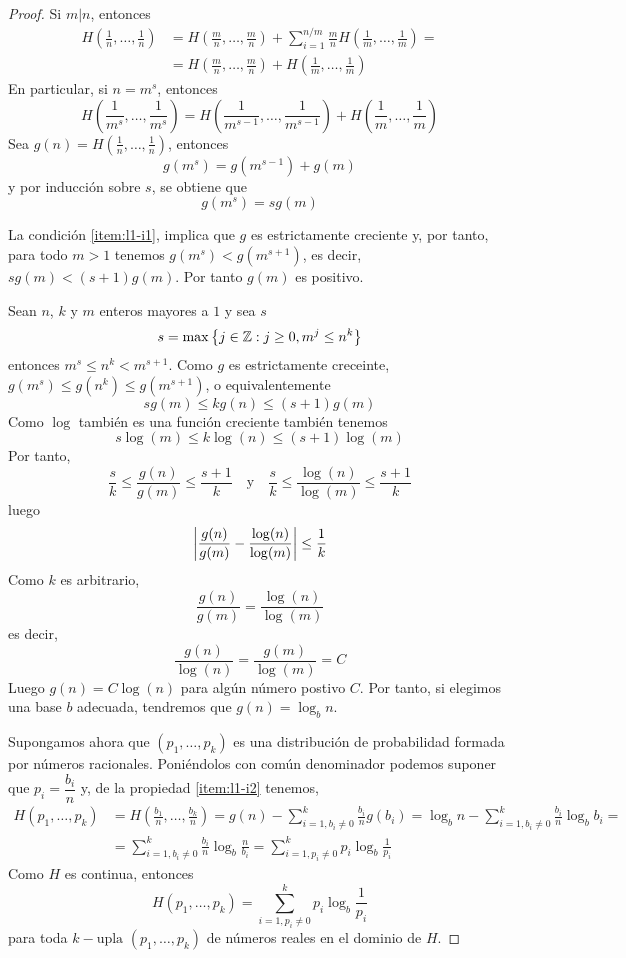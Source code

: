 \begin{proof}
    Si $m|n$, entonces
    \begin{equation*}
        \begin{split}
            H\left(\frac{1}{n},\dots,\frac{1}{n}\right) &= H\left(\frac{m}{n},\dots,\frac{m}{n}\right) + \sum_{i=1}^{n/m}\frac{m}{n}H\left(\frac{1}{m},\dots,\frac{1}{m}\right) = \\
            &= H\left(\frac{m}{n},\dots,\frac{m}{n}\right) + H\left(\frac{1}{m},\dots,\frac{1}{m}\right)
        \end{split}
    \end{equation*}
    En particular, si $n=m^s$, entonces
    $$H\left(\frac{1}{m^s},\dots,\frac{1}{m^s}\right) = H\left(\frac{1}{m^{s-1}},\dots,\frac{1}{m^{s-1}}\right) + H\left(\frac{1}{m},\dots,\frac{1}{m}\right)$$
    Sea $g(n)=H\left(\frac{1}{n},\dots,\frac{1}{n}\right)$, entonces
    $$g(m^s)=g(m^{s-1})+g(m)$$
    y por inducción sobre $s$, se obtiene que
    $$g(m^s)=sg(m)$$
    
    La condición \ref{item:l1-i1}, implica que $g$ es estrictamente creciente y, por tanto, para todo $m>1$ tenemos $g(m^s)<g(m^{s+1})$, es decir, $sg(m)<(s+1)g(m)$. Por tanto $g(m)$ es positivo.

    Sean $n$, $k$ y $m$ enteros mayores a $1$ y sea $s$ 
    $$s=\max\left\lbrace j\in\mathbb{Z} : j\geq 0, m^j\leq n^k\right\rbrace$$
    entonces $m^s\leq n^k<m^{s+1}$. Como $g$ es estrictamente creceinte, $g(m^s)\leq g(n^k)\leq g(m^{s+1})$, o equivalentemente
    $$sg(m)\leq kg(n)\leq (s+1)g(m)$$
    Como $\log$ también es una función creciente también tenemos
    $$s\log(m)\leq k\log(n)\leq (s+1)\log(m)$$
    Por tanto,
    $$\frac{s}{k}\leq\frac{g(n)}{g(m)}\leq\frac{s+1}{k}\quad\text{y}\quad\frac{s}{k}\leq\frac{\log(n)}{\log(m)}\leq\frac{s+1}{k}$$
    luego
    $$\left| \frac{g(n)}{g(m)}-\frac{\log(n)}{\log(m)}\right|\leq\frac{1}{k}$$
    Como $k$ es arbitrario,
    $$\frac{g(n)}{g(m)}=\frac{\log(n)}{\log(m)}$$
    es decir,
    $$\frac{g(n)}{\log(n)}=\frac{g(m)}{\log(m)}=C$$
    Luego $g(n)=C\log(n)$ para algún número postivo $C$. Por tanto, si elegimos una base $b$ adecuada, tendremos que $g(n)=\log_bn$.

    Supongamos ahora que $\left(p_1,\dots,p_k\right)$ es una distribución de probabilidad formada por números racionales. Poniéndolos con común denominador podemos suponer que $p_i=\dfrac{b_i}{n}$ y, de la propiedad \ref{item:l1-i2} tenemos,
    \begin{equation*}
        \begin{split}
            H(p_1,\dots,p_k) &= H\left(\frac{b_1}{n},\dots,\frac{b_k}{n}\right) = g(n) - \sum_{i=1, b_i\neq 0}^k\frac{b_i}{n}g(b_i) = \log_bn - \sum_{i=1,b_i\neq 0}^k\frac{b_i}{n}\log_bb_i = \\
            &= \sum_{i=1,b_i\neq 0}^k\frac{b_i}{n}\log_b\frac{n}{b_i}=\sum_{i=1,p_i\neq 0}^kp_i\log_b\frac{1}{p_i}
        \end{split}
    \end{equation*}
    Como $H$ es continua, entonces
    $$H(p_1,\dots,p_k) = \sum_{i=1,p_i\neq 0}^kp_i\log_b\frac{1}{p_i}$$
    para toda $k-\text{upla}$ $(p_1,\dots,p_k)$ de números reales en el dominio de $H$.
\end{proof}

